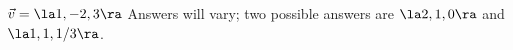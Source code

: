 {$\vec v = \la 1,-2,3\ra$
}
{Answers will vary; two possible answers are $\la 2,1,0\ra$ and $\la 1,1,1/3\ra$.
}
